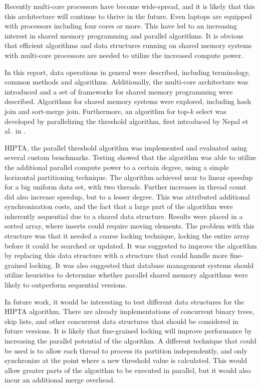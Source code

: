 Recently multi-core processors have become wide-spread, and it is
likely that this this architecture will continue to thrive in the
future. Even laptops are equipped with processors including four cores
or more. This have led to an increasing interest in shared memory
programming and parallel algorithms. It is obvious that efficient
algorithms and data structures running on shared memory systems with
multi-core processors are needed to utilize the increased compute
power.

In this report, data operations in general were described, including
terminology, common methods and algorithms. Additionally, the
multi-core architecture was introduced and a set of frameworks for
shared memory programming were described. Algorithms for shared memory
systems were explored, including hash join and sort-merge join.
Furthermore, an algorithm for top-$k$ select was developed by
parallelizing the threshold algorithm, first introduced by Nepal et
al.\ in \cite{ramakrishna}.

HIPTA, the parallel threshold algorithm was implemented and evaluated
using several custom benchmarks. Testing showed that the algorithm was
able to utilize the additional parallel compute power to a certain
degree, using a simple horizontal partitioning technique. The
algorithm achieved near to linear speedup for a big uniform data set,
with two threads. Further increases in thread count did also increase
speedup, but to a lesser degree. This was attributed additional
synchronization costs, and the fact that a large part of the algorithm
were inherently sequential due to a shared data structure. Results
were placed in a sorted array, where inserts could require moving
elements. The problem with this structure was that it needed a coarse
locking technique, locking the entire array before it could be
searched or updated. It was suggested to improve the algorithm by
replacing this data structure with a structure that could handle more
fine-grained locking. It was also suggested that database management
systems should utilize heuristics to determine whether parallel shared
memory algorithms were likely to outperform sequential versions.

In future work, it would be interesting to test different data
structures for the HIPTA algorithm. There are already implementations
of concurrent binary trees, skip lists, and other concurrent data
structures that should be considered in future versions. It is likely
that fine-grained locking will improve performance by increasing the
parallel potential of the algorithm. A different technique that could
be used is to allow each thread to process its partition
independently, and only synchronize at the point where a new threshold
value is calculated. This would allow greater parts of the algorithm
to be executed in parallel, but it would also incur an additional
merge overhead.

